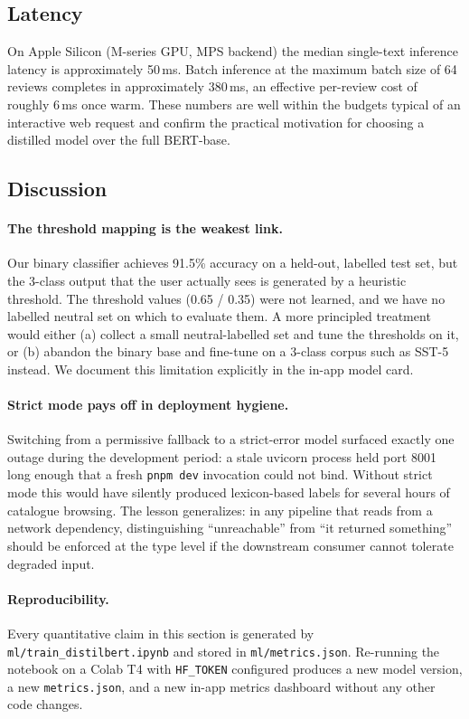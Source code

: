 \documentclass[11pt, a4paper]{article}
\begin{document}
\subsection{Latency}

On Apple Silicon (M-series GPU, MPS backend) the median single-text inference latency is approximately 50\,ms. Batch inference at the maximum batch size of 64 reviews completes in approximately 380\,ms, an effective per-review cost of roughly 6\,ms once warm. These numbers are well within the budgets typical of an interactive web request and confirm the practical motivation for choosing a distilled model over the full BERT-base.

\subsection{Discussion}

\paragraph{The threshold mapping is the weakest link.}
Our binary classifier achieves 91.5\% accuracy on a held-out, labelled test set, but the 3-class output that the user actually sees is generated by a heuristic threshold. The threshold values (0.65 / 0.35) were not learned, and we have no labelled neutral set on which to evaluate them. A more principled treatment would either (a) collect a small neutral-labelled set and tune the thresholds on it, or (b) abandon the binary base and fine-tune on a 3-class corpus such as SST-5 instead. We document this limitation explicitly in the in-app model card.

\paragraph{Strict mode pays off in deployment hygiene.}
Switching from a permissive fallback to a strict-error model surfaced exactly one outage during the development period: a stale uvicorn process held port 8001 long enough that a fresh \texttt{pnpm dev} invocation could not bind. Without strict mode this would have silently produced lexicon-based labels for several hours of catalogue browsing. The lesson generalizes: in any pipeline that reads from a network dependency, distinguishing ``unreachable'' from ``it returned something'' should be enforced at the type level if the downstream consumer cannot tolerate degraded input.

\paragraph{Reproducibility.}
Every quantitative claim in this section is generated by \texttt{ml/train\_distilbert.ipynb} and stored in \texttt{ml/metrics.json}. Re-running the notebook on a Colab T4 with \texttt{HF\_TOKEN} configured produces a new model version, a new \texttt{metrics.json}, and a new in-app metrics dashboard without any other code changes.
\end{document}
